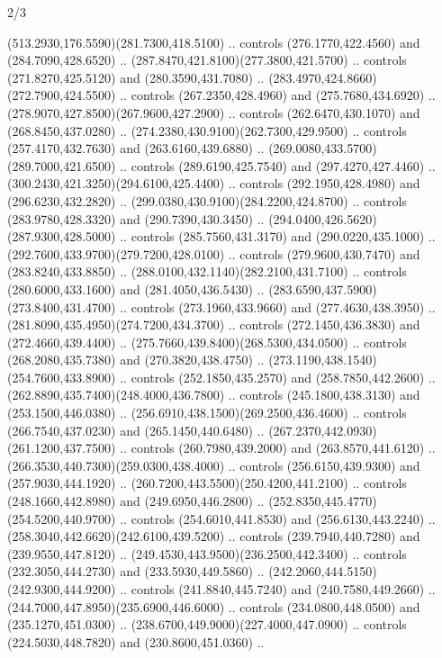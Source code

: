 \begin{flagdescription}{2/3}
\begin{scope}[xshift=0.5\flaglength,yshift=0.5\flagwidth,scale=\flagwidth/255]
\begin{scope}[y=-0.43pt, x=0.43pt,xshift=-193pt,yshift=133pt]
\begin{scope}[draw=black,line width=0.003\flagwidth]
  (513.2930,176.5590)(281.7300,418.5100) .. controls (276.1770,422.4560) and
  (284.7090,428.6520) .. (287.8470,421.8100)(277.3800,421.5700) .. controls
  (271.8270,425.5120) and (280.3590,431.7080) ..
  (283.4970,424.8660)(272.7900,424.5500) .. controls (267.2350,428.4960) and
  (275.7680,434.6920) .. (278.9070,427.8500)(267.9600,427.2900) .. controls
  (262.6470,430.1070) and (268.8450,437.0280) ..
  (274.2380,430.9100)(262.7300,429.9500) .. controls (257.4170,432.7630) and
  (263.6160,439.6880) .. (269.0080,433.5700)(289.7000,421.6500) .. controls
  (289.6190,425.7540) and (297.4270,427.4460) ..
  (300.2430,421.3250)(294.6100,425.4400) .. controls (292.1950,428.4980) and
  (296.6230,432.2820) .. (299.0380,430.9100)(284.2200,424.8700) .. controls
  (283.9780,428.3320) and (290.7390,430.3450) ..
  (294.0400,426.5620)(287.9300,428.5000) .. controls (285.7560,431.3170) and
  (290.0220,435.1000) .. (292.7600,433.9700)(279.7200,428.0100) .. controls
  (279.9600,430.7470) and (283.8240,433.8850) ..
  (288.0100,432.1140)(282.2100,431.7100) .. controls (280.6000,433.1600) and
  (281.4050,436.5430) .. (283.6590,437.5900)(273.8400,431.4700) .. controls
  (273.1960,433.9660) and (277.4630,438.3950) ..
  (281.8090,435.4950)(274.7200,434.3700) .. controls (272.1450,436.3830) and
  (272.4660,439.4400) .. (275.7660,439.8400)(268.5300,434.0500) .. controls
  (268.2080,435.7380) and (270.3820,438.4750) ..
  (273.1190,438.1540)(254.7600,433.8900) .. controls (252.1850,435.2570) and
  (258.7850,442.2600) .. (262.8890,435.7400)(248.4000,436.7800) .. controls
  (245.1800,438.3130) and (253.1500,446.0380) ..
  (256.6910,438.1500)(269.2500,436.4600) .. controls (266.7540,437.0230) and
  (265.1450,440.6480) .. (267.2370,442.0930)(261.1200,437.7500) .. controls
  (260.7980,439.2000) and (263.8570,441.6120) ..
  (266.3530,440.7300)(259.0300,438.4000) .. controls (256.6150,439.9300) and
  (257.9030,444.1920) .. (260.7200,443.5500)(250.4200,441.2100) .. controls
  (248.1660,442.8980) and (249.6950,446.2800) ..
  (252.8350,445.4770)(254.5200,440.9700) .. controls (254.6010,441.8530) and
  (256.6130,443.2240) .. (258.3040,442.6620)(242.6100,439.5200) .. controls
  (239.7940,440.7280) and (239.9550,447.8120) ..
  (249.4530,443.9500)(236.2500,442.3400) .. controls (232.3050,444.2730) and
  (233.5930,449.5860) .. (242.2060,444.5150)(242.9300,444.9200) .. controls
  (241.8840,445.7240) and (240.7580,449.2660) ..
  (244.7000,447.8950)(235.6900,446.6000) .. controls (234.0800,448.0500) and
  (235.1270,451.0300) .. (238.6700,449.9000)(227.4000,447.0900) .. controls
  (224.5030,448.7820) and (230.8600,451.0360) ..

\end{scope}
\end{scope}
\end{scope}
\end{flagdescription}
